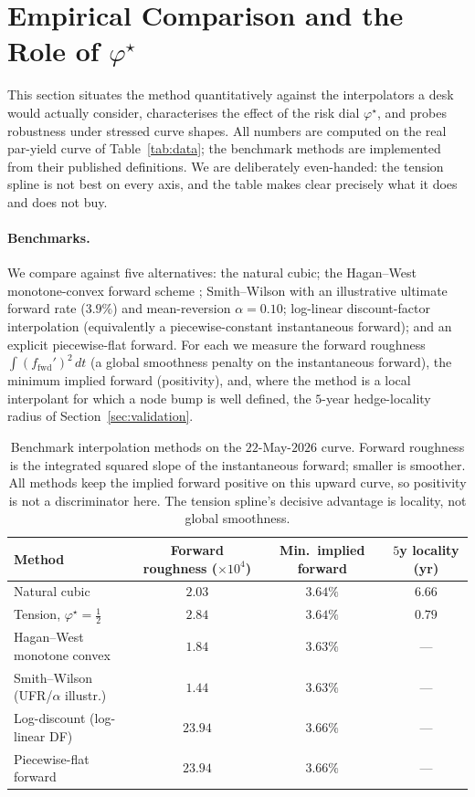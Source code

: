 \documentclass[10pt]{article}
\begin{document}
\section{Empirical Comparison and the Role of $\varphi^\star$}\label{sec:empirical}
This section situates the method quantitatively against the interpolators a desk would actually
consider, characterises the effect of the risk dial $\varphi^\star$, and probes robustness under
stressed curve shapes. All numbers are computed on the real par-yield curve of
Table~\ref{tab:data}; the benchmark methods are implemented from their published definitions.
We are deliberately even-handed: the tension spline is not best on every axis, and the table
makes clear precisely what it does and does not buy.

\paragraph{Benchmarks.} We compare against five alternatives: the natural cubic; the Hagan--West
monotone-convex forward scheme \cite{Hagan}; Smith--Wilson with an illustrative ultimate forward
rate ($3.9\%$) and mean-reversion $\alpha=0.10$; log-linear discount-factor interpolation
(equivalently a piecewise-constant instantaneous forward); and an explicit piecewise-flat forward.
For each we measure the forward roughness $\int (f_{\mathrm{fwd}}')^2\,dt$ (a global smoothness
penalty on the instantaneous forward), the minimum implied forward (positivity), and, where the
method is a local interpolant for which a node bump is well defined, the $5$-year hedge-locality
radius of Section~\ref{sec:validation}.

\begin{table}[h]\centering\small
\begin{tabular}{lccc}
\hline
Method & Forward roughness ($\times10^{4}$) & Min.\ implied forward & $5$y locality (yr)\\
\hline
Natural cubic                       & $2.03$  & $3.64\%$ & $6.66$\\
Tension, $\varphi^\star=\tfrac12$   & $2.84$  & $3.64\%$ & $\mathbf{0.79}$\\
Hagan--West monotone convex         & $1.84$  & $3.63\%$ & ---\\
Smith--Wilson (UFR/$\alpha$ illustr.)& $1.44$ & $3.63\%$ & ---\\
Log-discount (log-linear DF)        & $23.94$ & $3.66\%$ & ---\\
Piecewise-flat forward              & $23.94$ & $3.66\%$ & ---\\
\hline
\end{tabular}
\caption{Benchmark interpolation methods on the $22$-May-$2026$ curve. Forward roughness is the
integrated squared slope of the instantaneous forward; smaller is smoother. All methods keep the
implied forward positive on this upward curve, so positivity is not a discriminator here. The
tension spline's decisive advantage is locality, not global smoothness.}\label{tab:bench}
\end{table}
\end{document}
